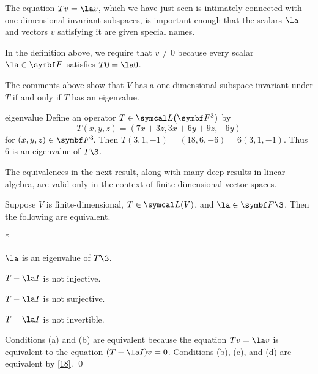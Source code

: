 The equation
$
Tv = \la v$,
which we have just seen is intimately connected with one-dimensional  invariant
subspaces, is important enough that the scalars $\la$ and vectors $v$ satisfying it
are given special names.



In the definition above, we require that $v \ne 0$ because every scalar $\la \in \F{}$ satisfies $T0 = \la 0$.

The comments above show that $V$ has a one-dimensional subspace invariant \mbox{under} $T$ if and only if $T$ has an eigenvalue.

\begin{example}{eigenvalue}
Define an operator $T \in \L\paren[\big]{\F3}$ by
\[
T(x,y,z) = (7x + 3z, 3x +6y + 9z, -6y)
\]
for $(x, y, z) \in \FF3$.
Then $T(3,1,-1) = (18, 6, -6) = 6(3,1,-1)$. Thus $6$ is an eigenvalue of $T\3$.
\end{example}

The equivalences in the next result, along with many deep results in linear algebra, are valid only in the context of finite-dimensional vector spaces.

{Suppose $V$ is finite-dimensional, $T \in \L(V)$, and $\la \in \F{}\3$. Then the following are equivalent.
\begin{subtheorem}*
\item
$\la$ is an eigenvalue of $T\3$.
\item
$T - \la I$ is not injective.
\item
$T - \la I$ is not surjective.  
\item
$T - \la I$ is not invertible.
\end{subtheorem}}

\proof
Conditions (a) and (b) are equivalent because the equation
$Tv = \la v$ is equivalent to the equation $(T - \la I)v = 0$.  Conditions (b), (c), and (d) are equivalent by  \ref{18}. \qed

